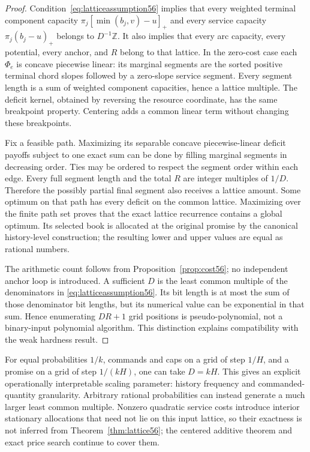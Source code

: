 \begin{proof}
Condition~\eqref{eq:latticeassumption56} implies that every weighted terminal component capacity
$\pi_j[\min(b_j,v)-u]_+$ and every service capacity $\pi_j(b_j-u)_+$ belongs to $D^{-1}\mathbb Z$. It also implies that every arc capacity, every potential, every anchor, and $R$ belong to that lattice. In the zero-cost case each $\Phi_e$ is concave piecewise linear: its marginal segments are the sorted positive terminal chord slopes followed by a zero-slope service segment. Every segment length is a sum of weighted component capacities, hence a lattice multiple. The deficit kernel, obtained by reversing the resource coordinate, has the same breakpoint property. Centering adds a common linear term without changing these breakpoints.

Fix a feasible path. Maximizing its separable concave piecewise-linear deficit payoffs subject to one exact sum can be done by filling marginal segments in decreasing order. Ties may be ordered to respect the segment order within each edge. Every full segment length and the total $R$ are integer multiples of $1/D$. Therefore the possibly partial final segment also receives a lattice amount. Some optimum on that path has every deficit on the common lattice. Maximizing over the finite path set proves that the exact lattice recurrence contains a global optimum. Its selected book is allocated at the original promise by the canonical history-level construction; the resulting lower and upper values are equal as rational numbers.

The arithmetic count follows from Proposition~\ref{prop:cost56}; no independent anchor loop is introduced. A sufficient $D$ is the least common multiple of the denominators in \eqref{eq:latticeassumption56}. Its bit length is at most the sum of those denominator bit lengths, but its numerical value can be exponential in that sum. Hence enumerating $DR+1$ grid positions is pseudo-polynomial, not a binary-input polynomial algorithm. This distinction explains compatibility with the weak hardness result.
\end{proof}

For equal probabilities $1/k$, commands and caps on a grid of step $1/H$, and a promise on a grid of step $1/(kH)$, one can take $D=kH$. This gives an explicit operationally interpretable scaling parameter: history frequency and commanded-quantity granularity. Arbitrary rational probabilities can instead generate a much larger least common multiple. Nonzero quadratic service costs introduce interior stationary allocations that need not lie on this input lattice, so their exactness is not inferred from Theorem~\ref{thm:lattice56}; the centered additive theorem and exact price search continue to cover them.

